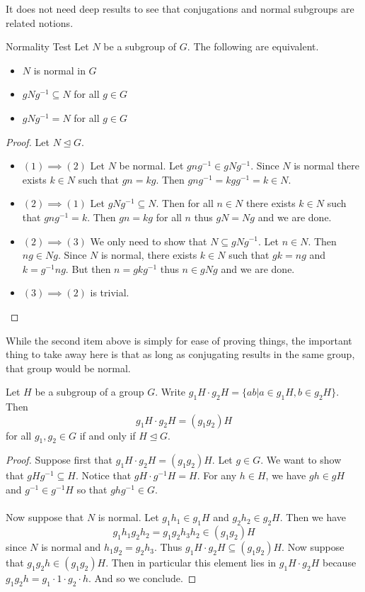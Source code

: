 \documentclass[a4paper]{article}
\begin{document}
It does not need deep results to see that conjugations and normal subgroups are related notions. 

\begin{thm}{Normality Test}{} Let $N$ be a subgroup of $G$. The following are equivalent. 
\begin{itemize}
\item $N$ is normal in $G$
\item $gNg^{-1}\subseteq N$ for all $g\in G$
\item $gNg^{-1}=N$ for all $g\in G$
\end{itemize}\tcbline
\begin{proof} Let $N\trianglelefteq G$. 
\begin{itemize}
\item $(1)\implies(2)$ Let $N$ be normal. Let $gng^{-1}\in gNg^{-1}$. Since $N$ is normal there exists $k\in N$ such that $gn=kg$. Then $gng^{-1}=kgg^{-1}=k\in N$. 
\item $(2)\implies(1)$ Let $gNg^{-1}\subseteq N$. Then for all $n\in N$ there exists $k\in N$ such that $gng^{-1}=k$. Then $gn=kg$ for all $n$ thus $gN=Ng$ and we are done. 
\item $(2)\implies(3)$ We only need to show that $N\subseteq gNg^{-1}$. Let $n\in N$. Then $ng\in Ng$. Since $N$ is normal, there exists $k\in N$ such that $gk=ng$ and $k=g^{-1}ng$. But then $n=gkg^{-1}$ thus $n\in gNg$ and we are done. 
\item $(3)\implies(2)$ is trivial. 
\end{itemize}
\end{proof}
\end{thm}

While the second item above is simply for ease of proving things, the important thing to take away here is that as long as conjugating results in the same group, that group would be normal. 

\begin{thm}{}{} Let $H$ be a subgroup of a group $G$. Write $g_1H\cdot g_2H=\{ab|a\in g_1H,b\in g_2H\}$. Then $$g_1H\cdot g_2H=(g_1g_2)H$$ for all $g_1,g_2\in G$ if and only if $H\trianglelefteq G$. \tcbline
\begin{proof}
Suppose first that $g_1H\cdot g_2H=(g_1g_2)H$. Let $g\in G$. We want to show that $gHg^{-1}\subseteq H$. Notice that $gH\cdot g^{-1}H=H$. For any $h\in H$, we have $gh\in gH$ and $g^{-1}\in g^{-1}H$ so that $ghg^{-1}\in G$. \\~\\

Now suppose that $N$ is normal. Let $g_1h_1\in g_1H$ and $g_2h_2\in g_2H$. Then we have $$g_1h_1g_2h_2=g_1g_2h_3h_2\in(g_1g_2)H$$ since $N$ is normal and $h_1g_2=g_2h_3$. Thus $g_1H\cdot g_2H\subseteq(g_1g_2)H$. Now suppose that $g_1g_2h\in(g_1g_2)H$. Then in particular this element lies in $g_1H\cdot g_2 H$ because $g_1g_2h=g_1\cdot 1\cdot g_2\cdot h$. And so we conclude. 
\end{proof}
\end{thm}
\end{document}

